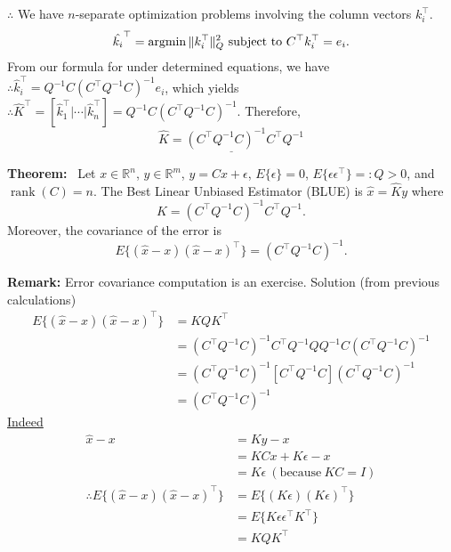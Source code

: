 \documentclass[letterpaper]{article}
\newcommand{\real}{\mathbb R}  %
\begin{document}
    $\therefore $ We have $n$-separate optimization problems involving the column vectors $k_i^\top $.
    \begin{equation*}
        \hat{k_i}^\top = \operatorname{argmin} \|k_i^\top \|_Q^2\textnormal{  subject to  } C^\top k_i^\top=e_i.
    \end{equation*}
    From our formula for under determined equations, we have
      \newline
    $\therefore \hat{k}_i^\top = Q^{-1}C(C^\top Q^{-1}C)^{-1}e_i$, which yields
    \newline
    $\therefore \hat{K}^\top = [\hat{k}_1^\top| \cdots |\hat{k}_n^\top]=Q^{-1}C(C^\top Q^{-1}C)^{-1}.$
    \newline
    Therefore,
    \begin{equation*}
        \underline{\hat{K}= (C^\top Q^{-1}C)^{-1}C^\top Q^{-1}}
    \end{equation*}


    \textbf{Theorem:}~ Let $x\in\real^n$, $y\in\real^m$, $y=Cx+\epsilon$, $E\{\epsilon\}=0$, $E\{\epsilon\epsilon^\top\}=:Q>0$, and $\operatorname{rank}(C)=n$. The Best Linear Unbiased Estimator (BLUE) is $\hat{x}=\hat{K}y$ where
    \begin{equation*}
        \hat{K}=\left(C^\top Q^{-1}C\right)^{-1}C^\top Q^{-1}.
    \end{equation*}
    Moreover, the covariance of the error is
    \begin{equation*}
        E\{\left(\hat{x}-x\right)\left(\hat{x}-x\right)^\top\}=\left(C^\top Q^{-1}C\right)^{-1}.
    \end{equation*}


    \textbf{Remark:} Error covariance computation is an exercise. Solution (from previous calculations)
    \begin{align*}
        E\{\left(\hat{x}-x\right)\left(\hat{x}-x\right)^\top\}&=KQK^\top\\
        &=\left(C^\top Q^{-1}C\right)^{-1}C^\top Q^{-1}QQ^{-1}C\left(C^\top Q^{-1}C\right)^{-1}\\
        &=\left(C^\top Q^{-1}C\right)^{-1}\left[C^\top Q^{-1}C\right]\left(C^\top Q^{-1}C\right)^{-1}\\
        &=\left(C^\top Q^{-1}C\right)^{-1}
    \end{align*}
    \underline{Indeed}
    \begin{align*}
        \hat{x}-x&=Ky-x\\
        &=KCx+K\epsilon-x\\
        &=K\epsilon~(\text{because}~KC=I)\\
        \therefore E\{(\hat{x}-x)(\hat{x}-x)^\top\}&=E\{(K\epsilon)(K\epsilon)^\top\}\\
        &=E\{K\epsilon\epsilon^\top K^\top\}\\
        &=KQK^\top
    \end{align*}
\end{document}
